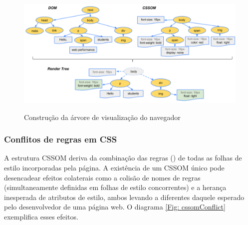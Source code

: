 \begin{figure}[h]
	\centering
	\includegraphics[width=\textwidth]{diagramas/render-tree-construction.png}
	\label{Fig: renderTreeCtor}
	\caption[Construção da árvore de visualização do navegador]{Construção da árvore de visualização do navegador \cite{Google2018_Rendering}}
\end{figure}


\subsubsection{Conflitos de regras em CSS}
A estrutura CSSOM deriva da combinação das regras () de todas as folhas de estilo incorporadas pela página. A existência de um CSSOM único pode desencadear efeitos colaterais como a colisão de nomes de regras (simultaneamente definidas em folhas de estilo concorrentes) e a herança inesperada de atributos de estilo, ambos levando a  diferentes daquele esperado pelo desenvolvedor de uma página web. O diagrama \ref{Fig: cssomConflict} exemplifica esses efeitos.

